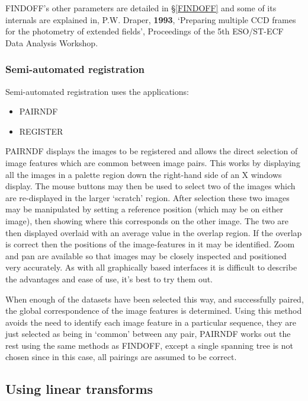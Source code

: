 \documentclass[twoside,11pt]{article}
\newcommand{\hyperref}[4]{#2\ref{#4}#3}
\newcommand{\htmlref}[2]{#1}
\newcommand{\xlabel}[1]{}
\renewcommand{\_}{\texttt{\symbol{95}}}
\newcommand{\routine}[1]{{\sc #1}}
\newcommand{\xroutine}[1]{\htmlref{{\sc #1}}{#1}}
\begin{document}
FINDOFF's other parameters are detailed in
\hyperref{a later section}{\S}{}{FINDOFF} and some of its internals are
explained in, P.W. Draper, {\bf 1993}, `Preparing multiple CCD frames for the
photometry of extended fields', Proceedings of the 5th ESO/ST-ECF Data
Analysis Workshop.

\subsubsection{\xlabel{semiautomated}Semi-automated registration}

Semi-automated registration uses the applications:
\begin{itemize}
\item \xroutine{PAIRNDF}
\item \xroutine{REGISTER}
\end{itemize}

\routine{PAIRNDF} displays the images to be registered and allows the direct
selection of image features which are common between image pairs.
This works by displaying all the images in a palette region down the
right-hand side of an X windows display. The mouse buttons may then be
used to select two of the images which are re-displayed in the larger
`scratch' region. After selection these two images may be manipulated
by setting a reference position (which may be on either image), then
showing where this corresponds on the other image. The two are then
displayed overlaid with an average value in the overlap region. If the
overlap is correct then the positions of the image-features in it may
be identified. Zoom and pan are available so that images may be
closely inspected and positioned very accurately. As with all
graphically based interfaces it is difficult to describe the
advantages and ease of use, it's best to try them out.

When enough of the datasets have been selected this way, and
successfully paired, the global correspondence of the image features
is determined. Using this method avoids the need to identify each
image feature in a particular sequence, they are just selected as
being in `common' between any pair, \routine{PAIRNDF} works out the rest using
the same methods as \xroutine{FINDOFF}, except a single spanning tree is not
chosen since in this case, all pairings are assumed to be correct.

\subsection{\xlabel{usinglineartransforms}Using linear transforms}
\end{document}
